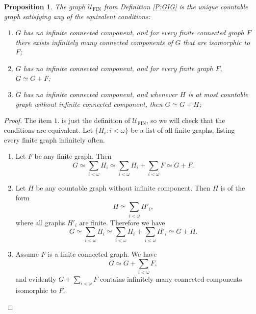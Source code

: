 \documentclass{amsart}
\newtheorem{prop}[theorem]{Proposition}
\theoremstyle{plain}
\theoremstyle{definition}
\theoremstyle{remark}
\numberwithin{equation}{section}
\newcommand{\UU}{\mathcal{U}}
\DeclareMathOperator{\fin}{FIN}
\begin{document}
\begin{prop}\label{r:GIGunique} The graph \(\UU_{\fin}\) from Definition \ref{P:GIG} is the unique countable graph satisfying any of the equivalent conditions: 
\begin{enumerate}
    \item $G$ has no infinite connected component, and for every finite connected graph $F$ there exists infinitely many connected components of $G$ that are isomorphic to $F$;
    \item $G$ has no infinite connected component, and for every finite graph $F$, $G \simeq G+F$;
    \item $G$ has no infinite connected component, and whenever $H$ is at most countable graph without infinite connected component, then $G\simeq G+H$;
\end{enumerate}
\end{prop}
\begin{proof}
    The item $1.$ is just the definition of $\UU_{\fin}$, so we will check that the conditions are equivalent. Let $\{H_i : i<\omega\}$ be a list of all finite graphs, listing every finite graph infinitely often.
    \begin{enumerate}
        \item[$1.\implies 2.$] Let $F$ be any finite graph. Then 
        $$G\simeq \sum\limits_{i<\omega}H_i \simeq \sum\limits_{i<\omega}H_i+\sum\limits_{i<\omega}F\simeq G+F.$$
        \item[$2.\implies 3.$] Let $H$ be any countable graph without infinite component. Then $H$ is of the form
        $$H\simeq \sum\limits_{i<\omega}H'_i,$$ 
        where all graphs $H'_i$ are finite. Therefore we have
        $$G\simeq \sum\limits_{i<\omega}H_i \simeq \sum\limits_{i<\omega}H_i+\sum\limits_{i<\omega}H'_i\simeq G+H.$$
        \item[$3.\implies 1.$] Assume $F$ is a finite connected graph. We have 
        $$G\simeq G+\sum\limits_{i<\omega}F,$$
        and evidently $G+\sum\limits_{i<\omega}F$ contains infinitely many connected components isomorphic to $F$.
    \end{enumerate}
\end{proof}
\end{document}
